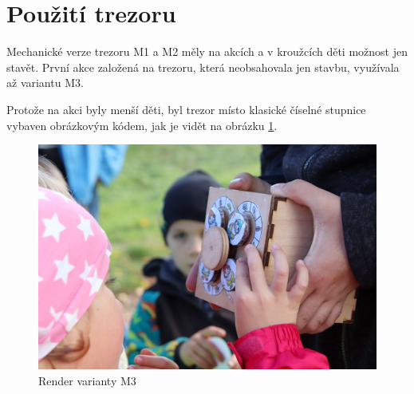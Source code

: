 \section{Použití trezoru}
Mechanické verze trezoru M1 a M2 měly na akcích a v kroužcích děti možnost jen stavět. První akce založená na trezoru, která neobsahovala jen stavbu, využívala až variantu M3.

Protože na akci byly menší děti, byl trezor místo klasické číselné stupnice  vybaven obrázkovým kódem, jak je vidět na obrázku \ref{fig:M3-trpaslici}.

\begin{figure}[htbp]
    \centering
    \includegraphics[width=\textwidth]{kapitoly/obrazky/M3/trpaslici.png}
    \caption{Render varianty M3}
    \label{fig:M3-trpaslici}
\end{figure}
